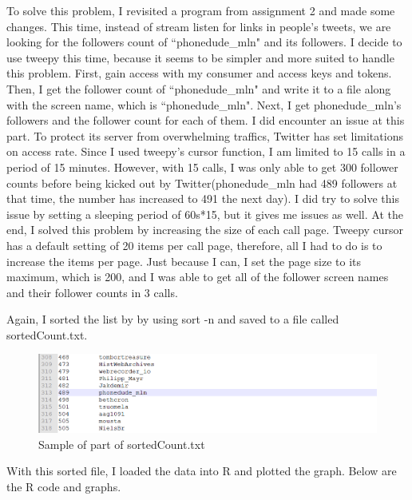 \documentclass[12pt]{article}
\begin{document}
To solve this problem, I revisited a program from assignment 2 and made some changes. This time, instead of stream listen for links in people's tweets, we are looking for the followers count of ``phonedude\_mln" and its followers. I decide to use tweepy this time, because it seems to be simpler and more suited to handle this problem. First, gain access with my consumer and access keys and tokens. Then, I get the follower count of ``phonedude\_mln" and write it to a file along with the screen name, which is ``phonedude\_mln". Next, I get phonedude\_mln's followers and the follower count for each of them. I did encounter an issue at this part. To protect its server from overwhelming traffics, Twitter has set limitations on access rate. Since I used tweepy's cursor function, I am limited to 15 calls in a period of 15 minutes. However, with 15 calls, I was only able to get 300 follower counts before being kicked out by Twitter(phonedude\_mln had 489 followers at that time, the number has increased to 491 the next day). I did try to solve this issue by setting a sleeping period of 60s*15, but it gives me issues as well. At the end, I solved this problem by increasing the size of each call page. Tweepy cursor has a default setting of 20 items per call page, therefore, all I had to do is to increase the items per page. Just because I can, I set the page size to its maximum, which is 200, and I was able to get all of the follower screen names and their follower counts in 3 calls. 



\noindent
Again, I sorted the list by by using sort -n and saved to a file called sortedCount.txt.
\pagebreak

\begin{figure}[h]
\centering
\includegraphics[width=6.5in]{tSordedCount.png}
\caption{Sample of part of sortedCount.txt}
\end{figure}

\noindent
With this sorted file, I loaded the data into R and plotted the graph. Below are the R code and graphs. 


\end{document}
